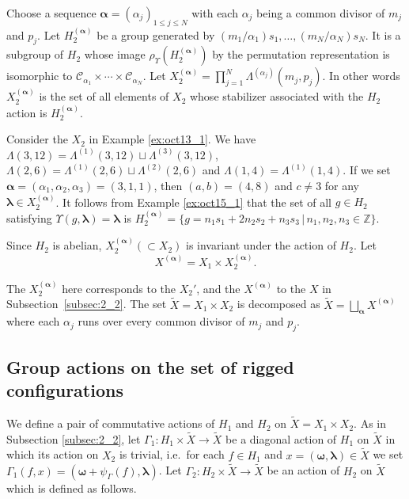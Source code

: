\documentclass[pdftex]{sigma}
\newcommand{\Z}{{\mathbb Z}}
\newcommand\bom{\boldsymbol{\omega}}
\newcommand\bol{\boldsymbol{\lambda}}
\newcommand\boa{\boldsymbol{\alpha}}
\begin{document}
Choose a sequence $\boa = (\alpha_j)_{1 \leq j \leq N}$ with
each $\alpha_j$ being a common divisor of $m_j$ and $p_j$.
Let $H_2^{(\boa)}$ be a group generated by $(m_1/\alpha_1) s_1, \ldots ,(m_N/\alpha_N) s_N$.
It is a subgroup of $H_2$ whose
image $\rho_{\Upsilon} (H_2^{(\boa)})$ by the permutation representation
is isomorphic to $\mathcal{C}_{\alpha_1} \times \cdots \times \mathcal{C}_{\alpha_N}$.
%
Let
$X_2^{(\boa)} = \prod_{j=1}^N \Lambda^{(\alpha_j)} (m_j,p_j)$.
In other words $X_2^{(\boa)}$ is the set of all elements of $X_2$ whose stabilizer
associated with the $H_2$ action is $H_2^{(\boa)}$.
\begin{example}\label{ex:oct15_2}
Consider the $X_2$ in Example \ref{ex:oct13_1}.
We have $\Lambda (3,12) = \Lambda^{(1)}(3,12) \sqcup \Lambda^{(3)}(3,12)$,
$\Lambda (2,6) = \Lambda^{(1)}(2,6) \sqcup \Lambda^{(2)}(2,6)$ and
$\Lambda (1,4) = \Lambda^{(1)}(1,4)$.
If we set $\boa = (\alpha_1, \alpha_2, \alpha_3) = (3,1,1)$,
then
$(a,b) = (4,8)$ and $c \ne 3$ for any $\bol \in X_2^{(\boa)}$.
It follows from Example \ref{ex:oct15_1} that
the set of all $g \in H_2$ satisfying $\Upsilon (g, \bol) = \bol$
is
$H_2^{(\boa)} = \{ g=  n_1 s_1 + 2 n_2 s_2 + n_3 s_3\, | \,n_1, n_2, n_3 \in \Z \}$.
\end{example}


Since $H_2$ is abelian, $X_2^{(\boa)} (\subset X_2)$ is invariant under the action of $H_2$.
Let
\begin{equation}\label{eq:apr22_2}
X^{(\boa)} = X_1 \times X_2^{(\boa)}.
\end{equation}

The $X_2^{(\boa)}$ here corresponds to the $X_2'$, and the $X^{(\boa)}$ to the $X$ in Subsection~\ref{subsec:2_2}.
The set
$\tilde{X} = X_1 \times X_2$ is decomposed as
\begin{math}
\tilde{X} = \bigsqcup_{\boa} X^{(\boa)}
\end{math}
where each $\alpha_j$ runs over every common divisor of $m_j$ and $p_j$.

\subsection{Group actions on the set of rigged conf\/igurations}\label{subsec:3_3}
We def\/ine a pair of commutative actions of $H_1$ and $H_2$ on $\tilde{X} = X_1 \times X_2$.
As in Subsection \ref{subsec:2_2}, let $\varGamma_1 : H_1 \times \tilde{X} \rightarrow \tilde{X}$
be a diagonal action of
$H_1$ on $\tilde{X}$
in which its action on $X_2$ is trivial, i.e.~for each $f \in H_1$ and $x =(\bom,\bol) \in \tilde{X}$
we set
$\varGamma_1(f, x) = (\bom + \psi_\varGamma (f), \bol)$.
Let
$\varGamma_2 : H_2 \times \tilde{X} \rightarrow \tilde{X}$
be an action of
$H_2$ on $\tilde{X}$
which is def\/ined as follows.
\end{document}
